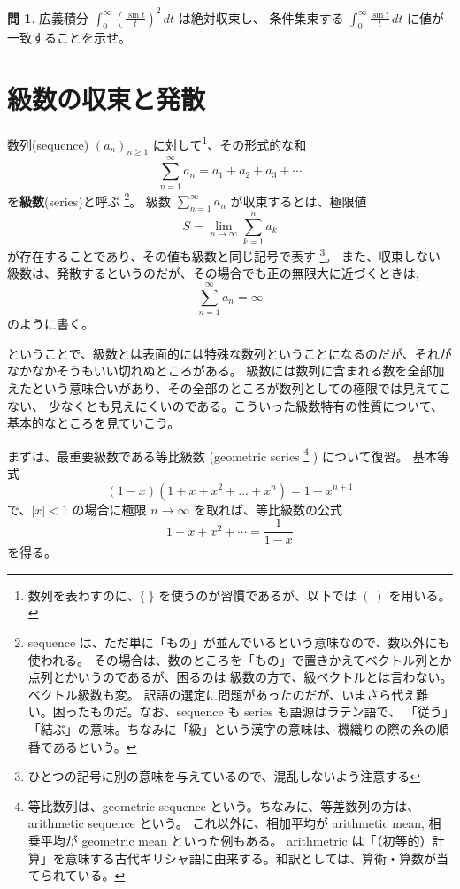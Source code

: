\documentclass[a4paper]{jsarticle}
\theoremstyle{definition}
\newtheorem{Exercise}{問}%
\theoremstyle{remark}
\begin{document}
\begin{Exercise}
  広義積分 $\displaystyle \int_0^\infty \left(\frac{\sin t}{t}\right)^2\, dt$ は絶対収束し、
  条件集束する $\displaystyle \int_0^\infty \frac{\sin t}{t}\, dt$ に値が一致することを示せ。
\end{Exercise}


\bigskip
\section{級数の収束と発散}
数列(sequence) $(a_n)_{n \geq 1}$ に対して\footnote{数列を表わすのに、$\{\ \}$ を使うのが習慣であるが、以下では $(\ )$ を用いる。}、その形式的な和
\[
\sum_{n=1}^\infty a_n = a_1 + a_2 + a_3 + \cdots
\]
を\textbf{級数}(series)と呼ぶ
\footnote{sequence は、ただ単に「もの」が並んでいるという意味なので、数以外にも使われる。
その場合は、数のところを「もの」で置きかえてベクトル列とか点列とかいうのであるが、困るのは
級数の方で、級ベクトルとは言わない。ベクトル級数も変。
訳語の選定に問題があったのだが、いまさら代え難い。困ったものだ。なお、sequence も series も語源はラテン語で、
「従う」「結ぶ」の意味。ちなみに「級」という漢字の意味は、機織りの際の糸の順番であるという。}。
級数 $\sum_{n=1}^\infty a_n$ が収束するとは、極限値
\[
S = \lim_{n \to \infty} \sum_{k=1}^n a_k 
\]
が存在することであり、その値も級数と同じ記号で表す
\footnote{ひとつの記号に別の意味を与えているので、混乱しないよう注意する}。
また、収束しない級数は、発散するというのだが、その場合でも正の無限大に近づくときは,
\[
\sum_{n=1}^\infty a_n = \infty
\]
のように書く。

ということで、級数とは表面的には特殊な数列ということになるのだが、それがなかなかそうもいい切れぬところがある。
級数には数列に含まれる数を全部加えたという意味合いがあり、その全部のところが数列としての極限では見えてこない、
少なくとも見えにくいのである。こういった級数特有の性質について、基本的なところを見ていこう。


まずは、最重要級数である等比級数 (geometric series 
\footnote{
等比数列は、geometric sequence という。ちなみに、等差数列の方は、arithmetic sequence という。
これ以外に、相加平均が arithmetic mean, 相乗平均が geometric mean といった例もある。
arithmetric は「（初等的）計算」を意味する古代ギリシャ語に由来する。和訳としては、算術・算数が当てられている。
}
) について復習。
基本等式
\[
(1-x)(1 + x + x^2 + \dots + x^n) = 1 - x^{n+1}
\]
で、$|x| < 1$ の場合に極限 $n \to \infty$ を取れば、等比級数の公式
\[
1 + x + x^2 + \cdots = \frac{1}{1-x}
\]
を得る。
\end{document}

